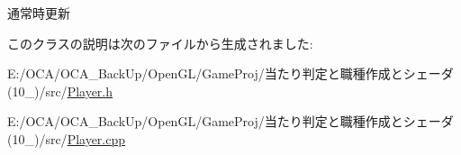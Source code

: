通常時更新 



このクラスの説明は次のファイルから生成されました\-:\begin{DoxyCompactItemize}
\item 
E\-:/\-O\-C\-A/\-O\-C\-A\-\_\-\-Back\-Up/\-Open\-G\-L/\-Game\-Proj/当たり判定と職種作成とシェーダ(10\-\_)/src/\hyperlink{_player_8h}{Player.\-h}\item 
E\-:/\-O\-C\-A/\-O\-C\-A\-\_\-\-Back\-Up/\-Open\-G\-L/\-Game\-Proj/当たり判定と職種作成とシェーダ(10\-\_)/src/\hyperlink{_player_8cpp}{Player.\-cpp}\end{DoxyCompactItemize}
